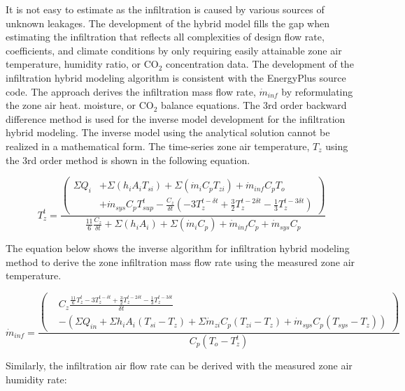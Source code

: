 It is not easy to estimate as the infiltration is caused by various sources of unknown leakages. The development of the hybrid model fills the gap when estimating the infiltration that reflects all complexities of design flow rate, coefficients, and climate conditions by only requiring easily attainable zone air temperature, humidity ratio, or CO$_2$ concentration data. The development of the infiltration hybrid modeling algorithm is consistent with the EnergyPlus source code. The approach derives the infiltration mass flow rate, $\dot{m}_{inf}$ by reformulating the zone air heat. moisture, or CO$_2$ balance equations. The 3rd order backward difference method is used for the inverse model development for the infiltration hybrid modeling. The inverse model using the analytical solution cannot be realized in a mathematical form. The time-series zone air temperature, $T_z$ using the 3rd order method is shown in the following equation.

\begin{equation}
T_z^t = \frac {\left(\begin{aligned}\Sigma Q_i &+ \Sigma(h_i A_i T_{si}) + \Sigma (\dot{m}_i C_p T_{zi}) + \dot{m}_{inf} C_p T_o\\ &+ \dot{m}_{sys} C_p T_{sup}^t - \frac{C_z}{\delta t}\left(-3T_z^{t-\delta t} + \frac {3} {2} T_z^{t-2\delta t} - \frac {1} {3} T_z^{t-3\delta t}\right)\end{aligned}\right)} { \frac {11}{6} \frac {C_z} {\delta t} + \Sigma (h_i A_i)  + \Sigma (\dot{m}_i C_p) + \dot{m}_{inf} C_p + \dot{m}_{sys} C_p}
\end{equation}

The equation below shows the inverse algorithm for infiltration hybrid modeling method to derive the zone infiltration mass flow rate using the measured zone air temperature.

\begin{equation}
\dot{m}_{inf} = \frac{\left(\begin{aligned}& C_z\frac {\frac{11}{6}T_{z}^{t}-3T_{z}^{t-\delta t}+\frac{3}{2}T_{z}^{t-2\delta t}-\frac{1}{3}T_{z}^{t-3\delta t}} {\delta t}\\ & - \left(\Sigma{Q_{in}}+\Sigma{h_i A_i (T_{si}-T_z)} + \Sigma{\dot{m}_{zi}C_p(T_{zi}-T_z)} + \dot{m}_{sys}C_p(T_{sys} - T_z)\right)\end{aligned}\right)} {C_p(T_o - T_{z}^{t})}
\end{equation}

Similarly, the infiltration air flow rate can be derived with the measured zone air humidity rate:

